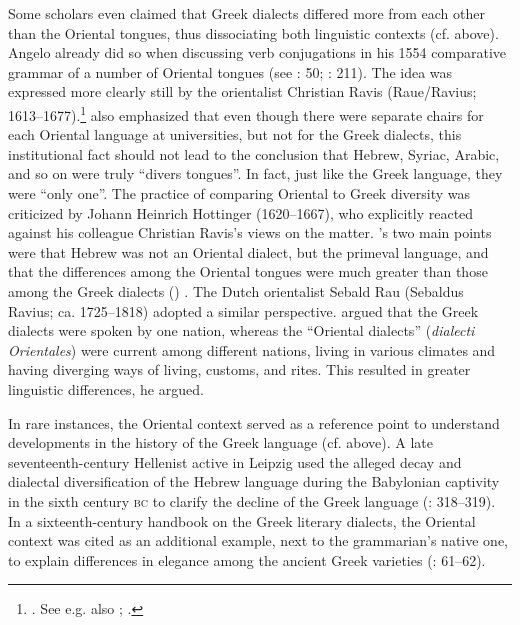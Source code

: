 Some scholars even claimed that Greek dialects differed more from each other than the Oriental tongues, thus dissociating both linguistic contexts (cf.  above). Angelo \citet[34]{Canini1554} already did so when discussing verb conjugations in his 1554 comparative grammar of a number of Oriental tongues (see \citealt{Contini1994}: 50; \citealt{Kessler-mesguich2013}: 211). The idea was expressed more clearly still by the orientalist Christian Ravis (Raue/Ravius; 1613–1677).\footnote{\citet[*.2\textsc{\textsuperscript{r}}]{Ravis1646}. See e.g. also \citet[51--52]{Hunt1739}; \citet[\textsc{xxvi}]{Groddeck1747}.} \citet[48]{Ravis1650} also emphasized that even though there were separate chairs for each Oriental language at universities, but not for the Greek dialects, this institutional fact should not lead to the conclusion that Hebrew, Syriac, Arabic, and so on were truly “divers tongues”. In fact, just like the Greek language, they were “only one”. The practice of comparing Oriental to Greek diversity was criticized by Johann Heinrich Hottinger (1620–1667), who explicitly reacted against his colleague Christian Ravis’s views on the matter. \citeauthor{Hottinger1661}'s two main points were that Hebrew was not an Oriental dialect, but the primeval language, and that the differences among the Oriental tongues were much greater than those among the Greek dialects (\citeyear[a.3\textsc{\textsuperscript{v}}–a.4\textsc{\textsuperscript{r}}]{Hottinger1661}) . The Dutch orientalist Sebald Rau (Sebaldus Ravius; ca. 1725–1818) adopted a similar perspective. \citet[20--21]{Rau1770} argued that the Greek dialects were spoken by one nation, whereas the “Oriental dialects” (\textit{dialecti Orientales}) were current among different nations, living in various climates and having diverging ways of living, customs, and rites. This resulted in greater linguistic differences, he argued.

In rare instances, the Oriental context served as a reference point to understand developments in the history of the Greek language (cf.  above). A late seventeenth-century Hellenist active in Leipzig used the alleged decay and dialectal diversification of the Hebrew language during the Babylonian captivity in the sixth century \textsc{bc} to clarify the decline of the Greek language (\citealt{Eling1691}: 318–319). In a sixteenth-century handbook on the Greek literary dialects, the Oriental context was cited as an additional example, next to the grammarian’s native one, to explain differences in elegance among the ancient Greek varieties (\citealt{Walper1589}: 61–62).

